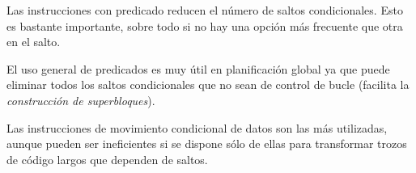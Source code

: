 \documentclass[10pt,a4paper,spanish]{report}
\begin{document}
Las instrucciones con predicado reducen el número de saltos condicionales. Esto es bastante importante, sobre todo si no hay una opción más frecuente que otra en el salto.

El uso general de predicados es muy útil en planificación global ya que puede eliminar todos los saltos condicionales que no sean de control de bucle (facilita la \textit{\textcolor{azul}{construcción de superbloques}}).

Las instrucciones de movimiento condicional de datos son las más utilizadas, aunque pueden ser ineficientes si se dispone sólo de ellas para transformar trozos de código largos que dependen de saltos.
\end{document}
